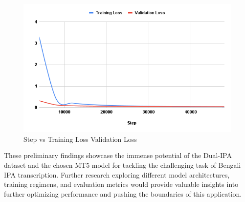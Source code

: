  \begin{figure}[htbp]
    \centering
    \includegraphics[width=\textwidth]{Images/Graph/Step vs Training Loss Validation Loss.png}
    \caption{Step vs Training Loss Validation Loss}
    \label{fig:project-flow}
\end{figure} 


These preliminary findings showcase the immense potential of the Dual-IPA dataset and the chosen MT5 model for tackling the challenging task of Bengali IPA transcription. Further research exploring different model architectures, training regimens, and evaluation metrics would provide valuable insights into further optimizing performance and pushing the boundaries of this application.
